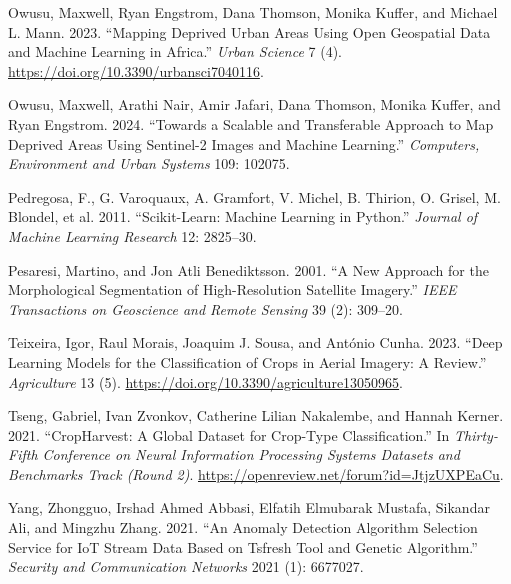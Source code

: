 \documentclass[
]{article}
\newlength{\cslhangindent}
\newlength{\cslentryspacingunit} %
\newenvironment{CSLReferences}[2] %
 {%
  \setlength{\parindent}{0pt}
  \ifodd #1
  \let\oldpar\par
  \def\par{\hangindent=\cslhangindent\oldpar}
  \fi
  \setlength{\parskip}{#2\cslentryspacingunit}
 }%
 {}
\begin{document}
\begin{CSLReferences}{1}{0}
\leavevmode{}%
Owusu, Maxwell, Ryan Engstrom, Dana Thomson, Monika Kuffer, and Michael
L. Mann. 2023. {``Mapping Deprived Urban Areas Using Open Geospatial
Data and Machine Learning in Africa.''} \emph{Urban Science} 7 (4).
\url{https://doi.org/10.3390/urbansci7040116}.

\leavevmode{}%
Owusu, Maxwell, Arathi Nair, Amir Jafari, Dana Thomson, Monika Kuffer,
and Ryan Engstrom. 2024. {``Towards a Scalable and Transferable Approach
to Map Deprived Areas Using Sentinel-2 Images and Machine Learning.''}
\emph{Computers, Environment and Urban Systems} 109: 102075.

\leavevmode{}%
Pedregosa, F., G. Varoquaux, A. Gramfort, V. Michel, B. Thirion, O.
Grisel, M. Blondel, et al. 2011. {``Scikit-Learn: Machine Learning in
{P}ython.''} \emph{Journal of Machine Learning Research} 12: 2825--30.

\leavevmode{}%
Pesaresi, Martino, and Jon Atli Benediktsson. 2001. {``A New Approach
for the Morphological Segmentation of High-Resolution Satellite
Imagery.''} \emph{IEEE Transactions on Geoscience and Remote Sensing} 39
(2): 309--20.

\leavevmode{}%
Teixeira, Igor, Raul Morais, Joaquim J. Sousa, and António Cunha. 2023.
{``Deep Learning Models for the Classification of Crops in Aerial
Imagery: A Review.''} \emph{Agriculture} 13 (5).
\url{https://doi.org/10.3390/agriculture13050965}.

\leavevmode{}%
Tseng, Gabriel, Ivan Zvonkov, Catherine Lilian Nakalembe, and Hannah
Kerner. 2021. {``CropHarvest: A Global Dataset for Crop-Type
Classification.''} In \emph{Thirty-Fifth Conference on Neural
Information Processing Systems Datasets and Benchmarks Track (Round 2)}.
\url{https://openreview.net/forum?id=JtjzUXPEaCu}.

\leavevmode{}%
Yang, Zhongguo, Irshad Ahmed Abbasi, Elfatih Elmubarak Mustafa, Sikandar
Ali, and Mingzhu Zhang. 2021. {``An Anomaly Detection Algorithm
Selection Service for IoT Stream Data Based on Tsfresh Tool and Genetic
Algorithm.''} \emph{Security and Communication Networks} 2021 (1):
6677027.

\end{CSLReferences}
\end{document}
